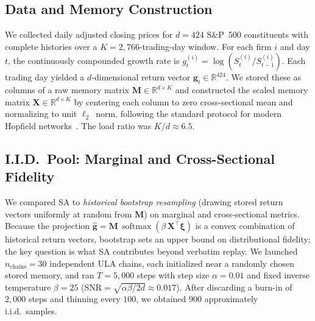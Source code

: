 \subsection{Data and Memory Construction}

We collected daily adjusted closing prices for $d=424$ S\&P~500 constituents with complete histories over a $K=2{,}766$-trading-day window. For each firm $i$ and day $t$, the continuously compounded growth rate is $g^{(i)}_t = \log(S^{(i)}_t / S^{(i)}_{t-1})$. Each trading day yielded a $d$-dimensional return vector $\mathbf{g}_t \in \mathbb{R}^{424}$. We stored these as columns of a raw memory matrix $\mathbf{M}\in\mathbb{R}^{d\times K}$ and constructed the scaled memory matrix $\mathbf{X}\in\mathbb{R}^{d\times K}$ by centering each column to zero cross-sectional mean and normalizing to unit $\ell_2$~norm, following the standard protocol for modern Hopfield networks~\cite{ramsauerHopfieldNetworksAll2021}. The load ratio was $K/d \approx 6.5$.

\subsection{I.I.D.\ Pool: Marginal and Cross-Sectional Fidelity}

We compared SA to \emph{historical bootstrap resampling} (drawing stored return vectors uniformly at random from $\mathbf{M}$) on marginal and cross-sectional metrics. Because the projection $\hat{\mathbf{g}}=\mathbf{M}\,\operatorname{softmax}(\beta\,\mathbf{X}^\top\boldsymbol{\xi})$ is a convex combination of historical return vectors, bootstrap sets an upper bound on distributional fidelity; the key question is what SA contributes beyond verbatim replay. We launched $n_{\text{chains}}=30$ independent ULA chains, each initialized near a randomly chosen stored memory, and ran $T=5{,}000$ steps with step size $\alpha=0.01$ and fixed inverse temperature $\beta=25$ ($\mathrm{SNR}=\sqrt{\alpha\beta/2d}\approx 0.017$). After discarding a burn-in of $2{,}000$ steps and thinning every $100$, we obtained $900$ approximately i.i.d.\ samples.

